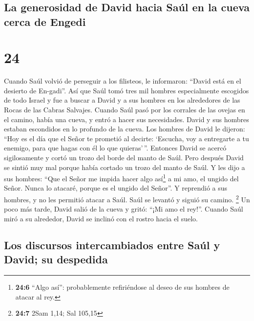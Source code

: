 \hypertarget{la-generosidad-de-david-hacia-sauxfal-en-la-cueva-cerca-de-engedi}{%
\subsection{La generosidad de David hacia Saúl en la cueva cerca de
Engedi}\label{la-generosidad-de-david-hacia-sauxfal-en-la-cueva-cerca-de-engedi}}

\hypertarget{section-23}{%
\section{24}\label{section-23}}

 Cuando Saúl volvió de perseguir a los filisteos, le
informaron: ``David está en el desierto de En-gadi''.  Así
que Saúl tomó tres mil hombres especialmente escogidos de todo Israel y
fue a buscar a David y a sus hombres en los alrededores de las Rocas de
las Cabras Salvajes.  Cuando Saúl pasó por los corrales de
las ovejas en el camino, había una cueva, y entró a hacer sus
necesidades. David y sus hombres estaban escondidos en lo profundo de la
cueva.  Los hombres de David le dijeron: ``Hoy es el día
que el Señor te prometió al decirte: `Escucha, voy a entregarte a tu
enemigo, para que hagas con él lo que quieras'\,''. Entonces David se
acercó sigilosamente y cortó un trozo del borde del manto de Saúl.
 Pero después David se sintió muy mal porque había cortado
un trozo del manto de Saúl.  Y les dijo a sus hombres:
``Que el Señor me impida hacer algo así\footnote{\textbf{24:6} ``Algo
  así'': probablemente refiriéndose al deseo de sus hombres de atacar al
  rey.} a mi amo, el ungido del Señor. Nunca lo atacaré, porque es el
ungido del Señor''.  Y reprendió a sus hombres, y no les
permitió atacar a Saúl. Saúl se levantó y siguió su camino. \footnote{\textbf{24:7}
  2Sam 1,14; Sal 105,15}  Un poco más tarde, David salió
de la cueva y gritó: ``¡Mi amo el rey!''. Cuando Saúl miró a su
alrededor, David se inclinó con el rostro hacia el suelo.

\hypertarget{los-discursos-intercambiados-entre-sauxfal-y-david-su-despedida}{%
\subsection{Los discursos intercambiados entre Saúl y David; su
despedida}\label{los-discursos-intercambiados-entre-sauxfal-y-david-su-despedida}}

